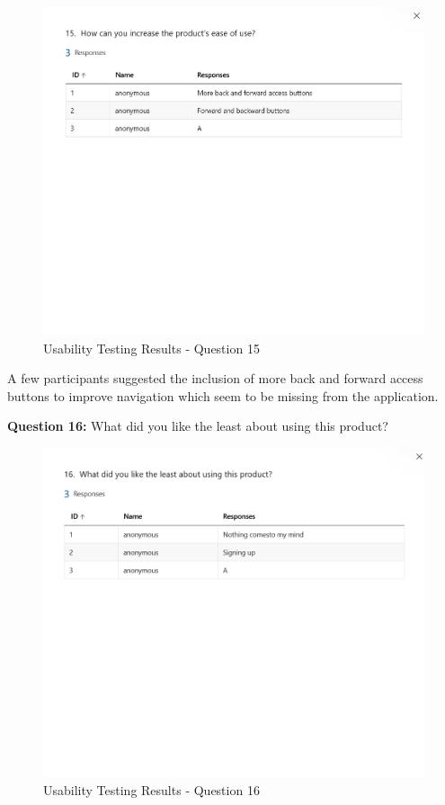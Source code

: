 \begin{justify}
\begin{figure}[H]
    \centerline{\includegraphics[width=150mm,scale=1]{figures/implementation_and_testing/testing/MUT/answers/Answers (15).png}}
    \caption{Usability Testing Results - Question 15}
    \label{Usability Testing Results - Question 15}
\end{figure}

\vspace{0.25cm}
\newendline A few participants suggested the inclusion of more back and forward access buttons to improve navigation which seem to be missing from the application.


\clearpage
\vspace{0.25cm}
\newendline \textbf{Question 16:} What did you like the least about using this product?

\begin{figure}[H]
    \centerline{\includegraphics[width=150mm,scale=1]{figures/implementation_and_testing/testing/MUT/answers/Answers (16).png}}
    \caption{Usability Testing Results - Question 16}
    \label{Usability Testing Results - Question 16}
\end{figure}


\end{justify}
